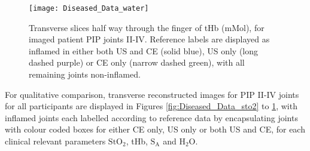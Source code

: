 \documentclass[twoside]{bhamthesis}
\theoremstyle{definition}
\begin{document}
\begin{figure}[!ht]
\centering\texttt{[image: Diseased\_Data\_water]}
\caption{Transverse slices half way through the finger of tHb (mMol), for imaged patient PIP joints II-IV. Reference labels are displayed as inflamed in either both US and CE (solid blue), US only (long dashed purple) or CE only (narrow dashed green), with all remaining joints non-inflamed.}
\label{fig:Diseased_Data_water}
\end{figure}

For qualitative comparison, transverse reconstructed images for PIP II-IV joints for all participants are displayed in Figures \ref{fig:Diseased_Data_sto2} to \ref{fig:Diseased_Data_water}, with inflamed joints each labelled according to reference data by encapsulating joints with colour coded boxes for either CE only, US only or both US and CE, for each clinical relevant parameters $\mathrm{StO_2}$, tHb, $\mathrm{S_A}$ and $\mathrm{H_2O}$.
\end{document}
